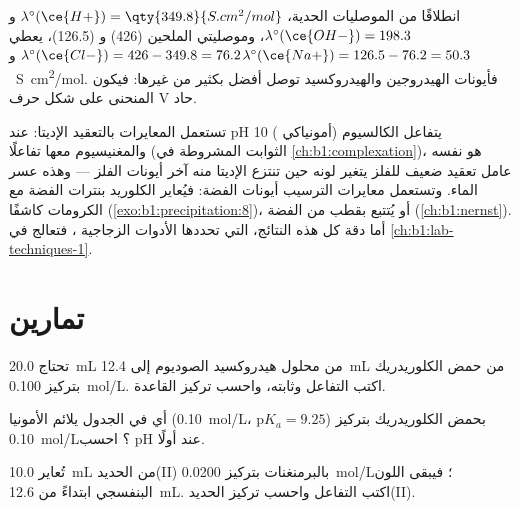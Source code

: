 انطلاقًا من الموصليات الحدية، $\lambda^\circ(\ce{H+}) =
\qty{349.8}{S.cm^2/mol}$ و$\lambda^\circ(\ce{OH-}) = 198.3$، وموصليتي
الملحين  (426) و (126.5)، يعطي 
$\lambda^\circ(\ce{Cl-}) = 426 - 349.8 = 76.2$ و$\lambda^\circ(\ce{Na+}) =
126.5 - 76.2 = 50.3$~\unit{S.cm^2/mol}. فأيونات الهيدروجين والهيدروكسيد
توصل أفضل بكثير من غيرها: فيكون المنحنى على شكل حرف V حاد.

تستعمل المعايرات بالتعقيد الإديتا: عند pH 10 ( أمونياكي) يتفاعل الكالسيوم
والمغنيسيوم معها تفاعلًا  (الثوابت المشروطة في
\cref{ch:b1:complexation})،  هو نفسه عامل تعقيد ضعيف
للفلز يتغير لونه حين تنتزع الإديتا منه آخر
أيونات الفلز --- وهذه  عسر الماء. وتستعمل معايرات الترسيب
أيونات الفضة: فيُعاير الكلوريد بنترات الفضة مع
الكرومات كاشفًا (\cref{exo:b1:precipitation:8})، أو يُتتبع
بقطب من الفضة (\cref{ch:b1:nernst}). أما دقة كل هذه
النتائج، التي تحددها الأدوات الزجاجية ، فتعالج في
\cref{ch:b1:lab-techniques-1}.

\section{تمارين}

\begin{exercise}[$\star$]\label{exo:b1:titration-methods:1}
تحتاج \qty{20.0}{mL} من محلول هيدروكسيد الصوديوم إلى \qty{12.4}{mL} من
حمض الكلوريدريك بتركيز \qty{0.100}{mol/L}. اكتب التفاعل وثابته،
واحسب تركيز القاعدة.
\end{exercise}

\begin{exercise}[$\star$]\label{exo:b1:titration-methods:2}
أي  في الجدول يلائم  الأمونيا (\qty{0.10}{mol/L}،
$\mathrm{p}K_a = 9.25$) بحمض الكلوريدريك بتركيز \qty{0.10}{mol/L}؟ احسب
pH عند  أولًا.
\end{exercise}

\begin{exercise}[$\star$]\label{exo:b1:titration-methods:3}
تُعاير \qty{10.0}{mL} من الحديد(II) بالبرمنغنات بتركيز
\qty{0.0200}{mol/L}؛ فيبقى اللون البنفسجي ابتداءً من \qty{12.6}{mL}.
اكتب التفاعل واحسب تركيز الحديد(II).
\end{exercise}


